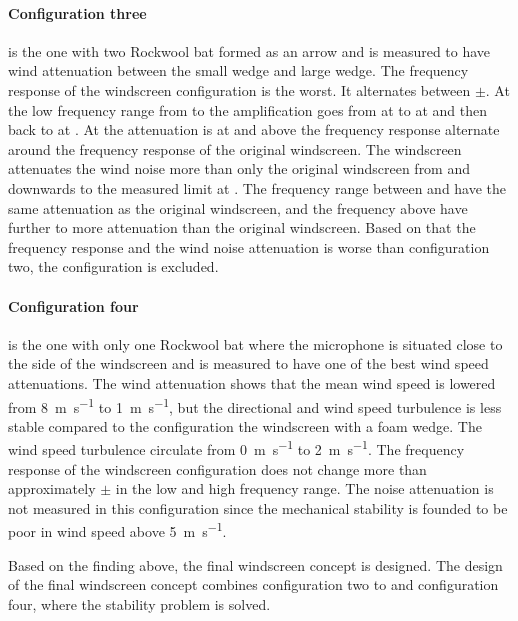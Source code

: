 \paragraph{Configuration three} is the one with two Rockwool bat formed as an arrow and is measured to have wind attenuation between the small wedge and large wedge. The frequency response of the windscreen configuration is the worst. It alternates between $\pm$. At the low frequency range from  to  the amplification goes from  at  to  at  and then back to   at . At   the attenuation is at  and above the frequency response alternate around the frequency response of the original windscreen. The windscreen attenuates the wind noise  more than only the original windscreen from  and downwards to the measured limit at . The frequency range between  and  have the same attenuation as the original windscreen, and the frequency above have further  to  more attenuation than the original windscreen. Based on that the frequency response and the wind noise attenuation is worse than configuration two, the configuration is excluded.

\paragraph{Configuration four} is the one with only one Rockwool bat where the microphone is situated close to the side of the windscreen and is measured to have one of the best wind speed attenuations. The wind attenuation shows that the mean wind speed is lowered from \SI{8}{\meter\per\second} to \SI{1}{\meter\per\second}, but the directional and wind speed turbulence is less stable compared to the configuration the windscreen with a foam wedge. The wind speed turbulence circulate from \SI{0}{\meter\per\second} to \SI{2}{\meter\per\second}. The frequency response of the windscreen configuration does not change more than approximately $\pm$ in the low and high frequency range. The noise attenuation is not measured in this configuration since the mechanical stability is founded to be poor in wind speed above \SI{5}{\meter\per\second}.




Based on the finding above, the final windscreen concept is designed. The design of the final windscreen concept combines configuration two to and configuration four, where the stability problem is solved. 

